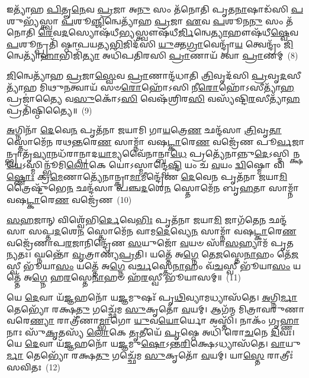 𑌇𑌤𑍍𑌯𑌾᳴𑌹 \ul{𑌪𑌿}\-𑌤𑍄\-\ul{𑌨𑍇}\-𑌵 \ul{𑌪𑍍𑌰}\-𑌜𑌾 𑌅\-\ul{𑌨𑍁} 𑌸𑌂 𑌤᳴𑌨𑍋𑌤𑌿 𑌪𑍃𑌤\-\ul{𑌨𑌾}\-𑌷𑌾𑌡᳴𑌸𑌿 \ul{𑌪}\-𑌶𑍁𑌭𑍍𑌯᳴𑌸𑍍𑌤𑍍𑌵𑌾 \ul{𑌪}\-𑌶𑍂\-\ul{𑌞𑍍𑌜𑌿}\-𑌨𑍍𑌵𑍇𑌤𑍍𑌯𑌾᳴𑌹 \ul{𑌪𑍍𑌰}\-𑌜𑌾 \ul{𑌏}\-𑌵 \ul{𑌪}\-𑌶𑍂𑌨\-\ul{𑌨𑍁} 𑌸𑌂 𑌤᳴𑌨𑍋𑌤𑌿 \ul{𑌰𑍇}\-𑌵\-\ul{𑌦}\-𑌸𑍍𑌯𑍋𑌷᳴𑌧𑍀\-\ul{𑌭𑍍𑌯}\-𑌸𑍍𑌤𑍍𑌵𑍗𑌷᳴𑌧𑍀\-\ul{𑌰𑍍𑌜𑌿}\-𑌨𑍍𑌵𑍇\-\ul{𑌤𑍍𑌯𑌾}\-𑌹𑍗𑌷᳴𑌧𑍀\-\ul{𑌷𑍍𑌵𑍇}\-𑌵 \ul{𑌪}\-𑌶𑍂𑌨𑍍𑌪𑍍𑌰𑌤𑌿᳴ 𑌷𑍍𑌠𑌾𑌪𑌯𑌤𑍍𑌯\-\ul{𑌭𑌿}\-𑌜𑌿𑌦᳴𑌸𑌿 \ul{𑌯𑍁}\-𑌕𑍍𑌤\-\ul{𑌗𑍍𑌰𑌾}\-𑌵𑍇𑌨𑍍𑌦𑍍𑌰𑌾᳴\-\ul{𑌯} 𑌤𑍍𑌵𑍇𑌨𑍍𑌦𑍍𑌰𑌂᳴ \ul{𑌜𑌿}\-𑌨𑍍𑌵𑍇𑌤𑍍𑌯𑌾᳴\-\ul{𑌹𑌾}\-𑌭𑌿𑌜𑌿᳴\-\ul{𑌤𑍍𑌯𑌾} 𑌅𑌧𑌿᳴𑌪𑌤𑌿𑌰𑌸𑌿 \ul{𑌪𑍍𑌰𑌾}\-𑌣𑌾𑌯᳴ 𑌤𑍍𑌵𑌾 \ul{𑌪𑍍𑌰𑌾}\-𑌣𑌮𑍍~(8)

\-\ul{𑌜𑌿}\-𑌨𑍍𑌵𑍇𑌤𑍍𑌯𑌾᳴𑌹 \ul{𑌪𑍍𑌰}\-𑌜𑌾\-\ul{𑌸𑍍𑌵𑍇}\-𑌵 \ul{𑌪𑍍𑌰𑌾}\-𑌣𑌾𑌨𑍍𑌦᳴𑌧𑌾𑌤𑌿 \ul{𑌤𑍍𑌰𑌿}\-𑌵𑍃𑌦᳴𑌸𑌿 \ul{𑌪𑍍𑌰}\-𑌵𑍃\-\ul{𑌦}\-𑌸𑍀𑌤𑍍𑌯𑌾᳴𑌹 𑌮𑌿𑌥𑍁\-\ul{𑌨}\-𑌤𑍍𑌵𑌾𑌯᳴ 𑌸𑍞\-\ul{𑌰𑍋}\-𑌹𑍋᳴\-𑌽𑌸𑌿 𑌨𑍀\-\ul{𑌰𑍋}\-𑌹𑍋᳴\-𑌽𑌸𑍀𑌤𑍍𑌯𑌾᳴\-\ul{𑌹} 𑌪𑍍𑌰𑌜𑌾॑𑌤𑍍𑌯𑍈 𑌵\-\ul{𑌸𑍁}\-𑌕𑍋᳴\-𑌽\-\ul{𑌸𑌿} 𑌵𑍇𑌷᳴𑌶𑍍𑌰𑌿𑌰\-\ul{𑌸𑌿} 𑌵𑌸𑍍𑌯᳴𑌷𑍍𑌟𑌿\-\ul{𑌰}\-𑌸𑍀𑌤𑍍𑌯𑌾᳴\-\ul{𑌹} 𑌪𑍍𑌰𑌤𑌿᳴𑌷𑍍𑌠𑌿𑌤𑍍𑌯𑍈॥~(9)

{\anuvakamend[{\-\ul{𑌜𑌿}\-𑌨𑍍𑌵𑍇𑌤𑍍𑌯𑌵᳴ \ul{𑌪𑍍𑌰}\-𑌜𑌾 𑌜𑌿᳴𑌨𑍍𑌵 \ul{𑌪𑍍𑌰𑌾}\-𑌣\-\ul{𑌨𑍍𑌤𑍍𑌰𑌿}\-\-\ul{𑍞}\-𑌶𑌚𑍍𑌚᳴}]}%

\-\ul{𑌅}\-𑌗𑍍𑌨𑌿𑌨𑌾᳴ \ul{𑌦𑍇}\-𑌵𑍇\-\ul{𑌨} 𑌪𑍃𑌤᳴𑌨𑌾 𑌜𑌯𑌾𑌮𑌿 𑌗𑌾\-\ul{𑌯}\-𑌤𑍍𑌰𑍇\-\ul{𑌣} 𑌛𑌨𑍍𑌦᳴𑌸𑌾 \ul{𑌤𑍍𑌰𑌿}\-𑌵𑍃\-\ul{𑌤𑌾} 𑌸𑍍𑌤𑍋𑌮𑍇᳴𑌨 𑌰𑌥\-\ul{𑌨𑍍𑌤}\-𑌰𑍇\-\ul{𑌣} 𑌸𑌾𑌮𑍍𑌨𑌾᳴ 𑌵𑌷\-\ul{𑌟𑍍𑌕𑌾}\-𑌰𑍇\-\ul{𑌣} 𑌵𑌜𑍍𑌰𑍇᳴𑌣 𑌪𑍂\-\ul{𑌰𑍍𑌵}\-𑌜𑌾𑌨𑍍𑌭𑍍𑌰𑌾𑌤𑍃᳴\-\ul{𑌵𑍍𑌯𑌾}\-𑌨𑌧᳴𑌰𑌾𑌨𑍍𑌪𑌾𑌦\-\ul{𑌯𑌾}\-𑌮𑍍𑌯𑌵𑍈᳴𑌨𑌾𑌨𑍍𑌬𑌾\-\ul{𑌧𑍇} 𑌪𑍍𑌰𑌤𑍍𑌯𑍇᳴𑌨𑌾𑌨𑍍𑌨𑍁\-\ul{𑌦𑍇}\-\-𑌽𑌸𑍍𑌮𑌿𑌨𑍍𑌕𑍍𑌷\-\ul{𑌯𑍇}\-\-𑌽𑌸𑍍𑌮𑌿𑌨𑍍𑌭𑍂᳴𑌮𑌿\-\ul{𑌲𑍋}\-𑌕𑍇 𑌯𑍋॑\-𑌽𑌸𑍍𑌮𑌾𑌨𑍍𑌦𑍍𑌵𑍇\-\ul{𑌷𑍍𑌟𑌿} 𑌯𑌂 𑌚᳴ \ul{𑌵}\-𑌯𑌂 \ul{𑌦𑍍𑌵𑌿}\-𑌷𑍍𑌮𑍋 𑌵𑌿\-\ul{𑌷𑍍𑌣𑍋𑌃} 𑌕𑍍𑌰\-\ul{𑌮𑍇}\-𑌣𑌾𑌤𑍍𑌯𑍇᳴𑌨𑌾𑌨𑍍𑌕𑍍𑌰𑌾\-\ul{𑌮𑌾}\-𑌮𑍀𑌨𑍍𑌦𑍍𑌰𑍇᳴𑌣 \ul{𑌦𑍇}\-𑌵𑍇\-\ul{𑌨} 𑌪𑍃𑌤᳴𑌨𑌾 𑌜𑌯𑌾\-\ul{𑌮𑌿} 𑌤𑍍𑌰𑍈𑌷𑍍𑌟𑍁᳴𑌭𑍇\-\ul{𑌨} 𑌛𑌨𑍍𑌦᳴𑌸𑌾 𑌪𑌞𑍍𑌚\-\ul{𑌦}\-𑌶𑍇\-\ul{𑌨} 𑌸𑍍𑌤𑍋𑌮𑍇᳴𑌨 𑌬𑍃\-\ul{𑌹}\-𑌤𑌾 𑌸𑌾𑌮𑍍𑌨𑌾᳴ 𑌵𑌷\-\ul{𑌟𑍍𑌕𑌾}\-𑌰𑍇\-\ul{𑌣} 𑌵𑌜𑍍𑌰𑍇᳴𑌣~(10)

\-\ul{𑌸}\-\-\ul{𑌹}\-𑌜𑌾𑌨𑍍 𑌵𑌿𑌶𑍍𑌵𑍇᳴𑌭𑌿\-\ul{𑌰𑍍𑌦𑍇}\-𑌵𑍇\-\ul{𑌭𑌿𑌃} 𑌪𑍃𑌤᳴𑌨𑌾 𑌜𑌯𑌾\-\ul{𑌮𑌿} 𑌜𑌾𑌗᳴𑌤𑍇\-\ul{𑌨} 𑌛𑌨𑍍𑌦᳴𑌸𑌾 𑌸𑌪𑍍𑌤\-\ul{𑌦}\-𑌶𑍇\-\ul{𑌨} 𑌸𑍍𑌤𑍋𑌮𑍇᳴𑌨 𑌵𑌾𑌮\-\ul{𑌦𑍇}\-𑌵𑍍𑌯𑍇\-\ul{𑌨} 𑌸𑌾𑌮𑍍𑌨𑌾᳴ 𑌵𑌷\-\ul{𑌟𑍍𑌕𑌾}\-𑌰𑍇\-\ul{𑌣} 𑌵𑌜𑍍𑌰𑍇᳴𑌣𑌾𑌪\-\ul{𑌰}\-𑌜𑌾𑌨𑌿𑌨𑍍𑌦𑍍𑌰𑍇᳴𑌣 \ul{𑌸}\-𑌯𑍁𑌜𑍋᳴ \ul{𑌵}\-𑌯𑍞 𑌸𑌾᳴\-\ul{𑌸}\-𑌹𑍍𑌯𑌾𑌮᳴ 𑌪𑍃𑌤\-\ul{𑌨𑍍𑌯}\-𑌤𑌃। 𑌘𑍍𑌨𑌨𑍍𑌤𑍋᳴ \ul{𑌵𑍃}\-𑌤𑍍𑌰𑌾𑌣𑍍𑌯᳴\-\ul{𑌪𑍍𑌰}\-𑌤𑌿। 𑌯𑌤𑍍𑌤𑍇᳴ 𑌅\-\ul{𑌗𑍍𑌨𑍇} 𑌤𑍇\-\ul{𑌜}\-𑌸𑍍𑌤𑍇\-\ul{𑌨𑌾}\-𑌹𑌂 𑌤𑍇᳴\-\ul{𑌜}\-𑌸𑍍𑌵𑍀 𑌭𑍂᳴𑌯𑌾\-\ul{𑌸𑌂} 𑌯𑌤𑍍𑌤𑍇᳴ 𑌅\-\ul{𑌗𑍍𑌨𑍇} 𑌵\-\ul{𑌰𑍍𑌚}\-𑌸𑍍𑌤𑍇\-\ul{𑌨𑌾}\-𑌹𑌂 𑌵᳴\-\ul{𑌚}\-𑌸𑍍𑌵𑍀 𑌭𑍂᳴𑌯𑌾\-\ul{𑌸𑌂} 𑌯𑌤𑍍𑌤𑍇᳴ 𑌅\-\ul{𑌗𑍍𑌨𑍇} 𑌹\-\ul{𑌰}\-𑌸𑍍𑌤𑍇\-\ul{𑌨𑌾}\-𑌹𑍞 𑌹᳴\-\ul{𑌰}\-𑌸𑍍𑌵𑍀 𑌭𑍂᳴𑌯𑌾𑌸𑌮𑍍॥~(11)

{\anuvakamend[{\-\ul{𑌬𑍃}\-\-\ul{𑌹}\-𑌤𑌾 𑌸𑌾𑌮𑍍𑌨𑌾᳴ 𑌵𑌷\-\ul{𑌟𑍍𑌕𑌾}\-𑌰𑍇\-\ul{𑌣} 𑌵𑌜𑍍𑌰𑍇᳴\-\ul{𑌣} 𑌷𑌟𑍍𑌚᳴𑌤𑍍𑌵𑌾𑌰𑌿𑍞𑌶𑌚𑍍𑌚}]}%

𑌯𑍇 \ul{𑌦𑍇}\-𑌵𑌾 𑌯᳴\-\ul{𑌜𑍍𑌞}\-𑌹𑌨𑍋᳴ 𑌯\-\ul{𑌜𑍍𑌞}\-𑌮𑍁𑌷𑌃᳴ 𑌪𑍃\-\ul{𑌥𑌿}\-𑌵𑍍𑌯𑌾𑌮𑌧𑍍𑌯𑌾𑌸᳴𑌤𑍇। \ul{𑌅}\-𑌗𑍍𑌨𑌿\-\ul{𑌰𑍍𑌮𑌾} 𑌤𑍇𑌭𑍍𑌯𑍋᳴ 𑌰𑌕𑍍𑌷\-\ul{𑌤𑍁} 𑌗𑌚𑍍𑌛𑍇᳴𑌮 \ul{𑌸𑍁}\-𑌕𑍃𑌤𑍋᳴ \ul{𑌵}\-𑌯𑌮𑍍। 𑌆𑌗᳴𑌨𑍍𑌮 𑌮𑌿𑌤𑍍𑌰𑌾𑌵𑌰𑍁𑌣𑌾 𑌵𑌰𑍇\-\ul{𑌣𑍍𑌯𑌾} 𑌰𑌾𑌤𑍍𑌰𑍀᳴𑌣𑌾\-\ul{𑌮𑍍𑌭𑌾}\-𑌗𑍋 \ul{𑌯𑍁}\-𑌵\-\ul{𑌯𑍋}\-𑌰𑍍𑌯𑍋 𑌅𑌸𑍍𑌤𑌿᳴। 𑌨𑌾𑌕𑌂᳴ 𑌗𑍃\-\ul{𑌹𑍍𑌣𑌾}\-𑌨𑌾𑌃 𑌸𑍁᳴\-\ul{𑌕𑍃}\-𑌤𑌸𑍍𑌯᳴ \ul{𑌲𑍋}\-𑌕𑍇 \ul{𑌤𑍃}\-𑌤𑍀𑌯𑍇᳴ \ul{𑌪𑍃}\-𑌷𑍍𑌠𑍇 𑌅𑌧𑌿᳴ 𑌰𑍋\-\ul{𑌚}\-𑌨𑍇 \ul{𑌦𑌿}\-𑌵𑌃। 𑌯𑍇 \ul{𑌦𑍇}\-𑌵𑌾 𑌯᳴\-\ul{𑌜𑍍𑌞}\-𑌹𑌨𑍋᳴ 𑌯\-\ul{𑌜𑍍𑌞}\-𑌮𑍁\-\ul{𑌷𑍋}\-\-𑌽𑌨𑍍𑌤\-\ul{𑌰𑌿}\-𑌕𑍍𑌷𑍇\-𑌽𑌧𑍍𑌯𑌾𑌸᳴𑌤𑍇। \ul{𑌵𑌾}\-𑌯𑍁\-\ul{𑌰𑍍𑌮𑌾} 𑌤𑍇𑌭𑍍𑌯𑍋᳴ 𑌰𑌕𑍍𑌷\-\ul{𑌤𑍁} 𑌗𑌚𑍍𑌛𑍇᳴𑌮 \ul{𑌸𑍁}\-𑌕𑍃𑌤𑍋᳴ \ul{𑌵}\-𑌯𑌮𑍍। 𑌯𑌾\-\ul{𑌸𑍍𑌤𑍇} 𑌰𑌾𑌤𑍍𑌰𑍀𑌃॑ 𑌸𑌵𑌿𑌤𑌃~(12)

